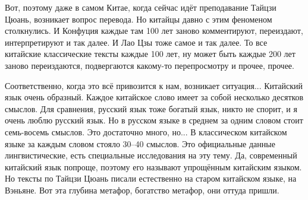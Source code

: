 Вот, поэтому даже в самом 
Китае, когда сейчас идёт преподавание Тайцзи Цюань,  
возникает вопрос перевода. Но китайцы давно с этим 
феноменом столкнулись.  И Конфуция каждые там 100 лет 
заново комментируют,  переиздают,  интерпретируют и 
так далее. И Лао Цзы тоже самое и так далее. То все 
китайские классические тексты каждые 100 лет, ну может 
быть каждые 200 лет заново переиздаются, подвергаются 
какому-то перепросмотру и прочее, прочее.  

Соответственно,  когда это всё привозится к нам,  
возникает ситуация... Китайский язык очень 
образный.  Каждое китайское слово имеет за собой 
несколько десятков смыслов.  Для сравнения, русский 
язык тоже богатый язык, никто не спорит, и я очень 
люблю русский язык. Но в русском языке в среднем за 
одним словом стоит семь-восемь смыслов. Это 
достаточно много, но...  В классическом китайском языке 
за каждым словом стояло 30--40 смыслов.  Это официальные 
данные лингвистические, есть специальные 
исследования на эту тему. Да, современный китайский 
язык попроще,  поэтому его называют упрощённым 
китайским языком.  Но тексты по Тайцзи Цюань писали 
естественно на старом китайском языке, на Вэньяне.  Вот эта 
глубина метафор, богатство метафор,  они оттуда 
пришли.


